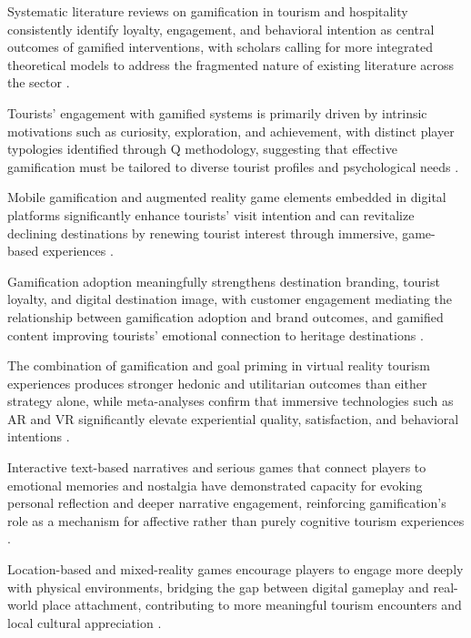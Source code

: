 \documentclass{research}
\begin{document}
Systematic literature reviews on gamification in tourism and hospitality consistently
identify loyalty, engagement, and behavioral intention as central outcomes of gamified
interventions, with scholars calling for more integrated theoretical models to address
the fragmented nature of existing literature across the sector
\citep{pasca2021,pradhan2023,malik2024}.

Tourists' engagement with gamified systems is primarily driven by intrinsic motivations
such as curiosity, exploration, and achievement, with distinct player typologies
identified through Q methodology, suggesting that effective gamification must be tailored
to diverse tourist profiles and psychological needs \citep{aebli2019,shen2020,chan2024}.

Mobile gamification and augmented reality game elements embedded in digital platforms
significantly enhance tourists' visit intention and can revitalize declining destinations
by renewing tourist interest through immersive, game-based experiences
\citep{ting2025,jo2025,fan2022}.

Gamification adoption meaningfully strengthens destination branding, tourist loyalty,
and digital destination image, with customer engagement mediating the relationship
between gamification adoption and brand outcomes, and gamified content improving
tourists' emotional connection to heritage destinations
\citep{aboushouk2021,zhang2025,chan2024}.

The combination of gamification and goal priming in virtual reality tourism experiences
produces stronger hedonic and utilitarian outcomes than either strategy alone, while
meta-analyses confirm that immersive technologies such as AR and VR significantly
elevate experiential quality, satisfaction, and behavioral intentions
\citep{liu2025,fan2022,jo2025}.

Interactive text-based narratives and serious games that connect players to emotional
memories and nostalgia have demonstrated capacity for evoking personal reflection and
deeper narrative engagement, reinforcing gamification's role as a mechanism for
affective rather than purely cognitive tourism experiences
\citep{cassone2021,pasca2021,aebli2019}.

Location-based and mixed-reality games encourage players to engage more deeply with
physical environments, bridging the gap between digital gameplay and real-world place
attachment, contributing to more meaningful tourism encounters and local cultural
appreciation \citep{huck2015,jo2025,fan2022}.
\end{document}
